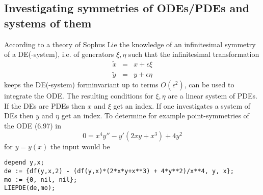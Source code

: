 \subsection{Investigating symmetries of ODEs/PDEs and systems of them}
According to a theory of Sophus Lie the knowledge of an infinitesimal symmetry
of a DE(-system), i.e. of generators $\xi, \eta$ such that the
infinitesimal transformation
\begin{eqnarray*}
\tilde{x} & = & x + \epsilon\xi   \\
\tilde{y} & = & y + \epsilon\eta
\end{eqnarray*}
keeps the DE(-system) forminvariant up to terms $O(\epsilon^2)$, can be used
to integrate the ODE. The resulting conditions for $\xi, \eta$ are a
linear system of PDEs. If the DEs are PDEs then $x$ and $\xi$ get an
index. If one investigates a system of DEs then $y$ and $\eta$ get an index.
To determine for example point-symmetries of the ODE (6.97) in \cite{Ka}
\begin{equation}
0 = x^4y'' - y'(2xy + x^3) + 4y^2  \label{k97}
\end{equation}
for $y = y(x)$ the input would be
\begin{verbatim}
depend y,x;
de := {df(y,x,2) - (df(y,x)*(2*x*y+x**3) + 4*y**2)/x**4, y, x};
mo := {0, nil, nil};
LIEPDE(de,mo);
\end{verbatim}

